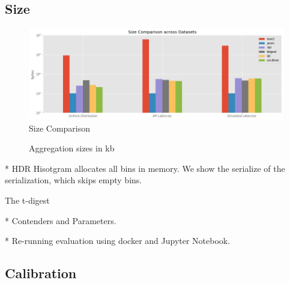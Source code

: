 \documentclass{article}
\theoremstyle{plain}
\theoremstyle{remark}
\begin{document}
\clearpage
\subsection{Size}

\begin{figure}[t!]
  \includegraphics[width=\textwidth]{evaluation/images/all_size.png}
  \caption{Size Comparison}
\end{figure}

\begin{figure}
  \centering
  
  \caption{Aggregation sizes in kb}
\end{figure}

* HDR Hisotgram allocates all bins in memory. We show the serialize of the serialization, which skips empty bins.

The t-digest

* Contenders and Parameters.

* Re-running evaluation using docker and Jupyter Notebook.


\clearpage
\subsection{Calibration}
\end{document}

